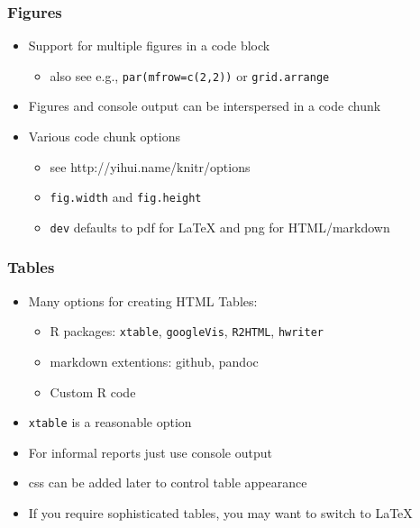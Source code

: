 \begin{frame}[fragile]\frametitle{Figures}

\begin{itemize}
\item
  Support for multiple figures in a code block

  \begin{itemize}
  \item
    also see e.g., \texttt{par(mfrow=c(2,2))} or \texttt{grid.arrange}
  \end{itemize}
\item
  Figures and console output can be interspersed in a code chunk
\item
  Various code chunk options

  \begin{itemize}
  \item
    see http://yihui.name/knitr/options
  \item
    \texttt{fig.width} and \texttt{fig.height}
  \item
    \texttt{dev} defaults to pdf for LaTeX and png for HTML/markdown
  \end{itemize}
\end{itemize}

\end{frame}

\begin{frame}[fragile]\frametitle{Tables}

\begin{itemize}
\item
  Many options for creating HTML Tables:

  \begin{itemize}
  \item
    R packages: \texttt{xtable}, \texttt{googleVis}, \texttt{R2HTML},
    \texttt{hwriter}
  \item
    markdown extentions: github, pandoc
  \item
    Custom R code
  \end{itemize}
\item
  \texttt{xtable} is a reasonable option
\item
  For informal reports just use console output
\item
  css can be added later to control table appearance
\item
  If you require sophisticated tables, you may want to switch to LaTeX
\end{itemize}

\end{frame}

